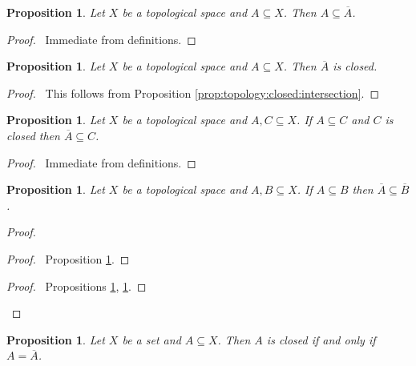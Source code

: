 \documentclass{report}
\let\qed\relax
\newtheorem{prop}[lm]{Proposition}
\theoremstyle{definition}
\begin{document}
  \begin{prop}
    \label{prop:topology:closure:A_sub_Abar}
    Let $X$ be a topological space and $A \subseteq X$. Then $A \subseteq
    \overline{A}$.
  \end{prop}

  \begin{proof}
    \pf\ Immediate from definitions. \qed
  \end{proof}

  \begin{prop}
    \label{prop:topology:closure:closed}
    Let $X$ be a topological space and $A \subseteq X$. Then $\overline{A}$ is
    closed.
  \end{prop}

  \begin{proof}
    \pf\ This follows from Proposition \ref{prop:topology:closed:intersection}.
    \qed
  \end{proof}

  \begin{prop}
    \label{prop:topology:closure:minimal}
    Let $X$ be a topological space and $A, C \subseteq X$. If $A \subseteq C$
    and $C$ is closed then $\overline{A} \subseteq C$.
  \end{prop}

  \begin{proof}
    \pf\ Immediate from definitions. \qed
  \end{proof}

  \begin{prop}
    \label{prop:topology:closure:monotone}
    Let $X$ be a topological space and $A, B \subseteq X$. If $A \subseteq B$
    then $\overline{A} \subseteq \overline{B}$.
  \end{prop}

  \begin{proof}
    \pf
    \begin{proof}
      \pf\ Proposition \ref{prop:topology:closure:A_sub_Abar}.
    \end{proof}
    \begin{proof}
      \pf\ Propositions \ref{prop:topology:closure:closed},
      \ref{prop:topology:closure:minimal}.
    \end{proof}
    \qed
  \end{proof}

  \begin{prop}
    \label{prop:topology:closure:closed2}
    Let $X$ be a set and $A \subseteq X$. Then $A$ is closed if and only if $A
    = \overline{A}$.
  \end{prop}
\end{document}
